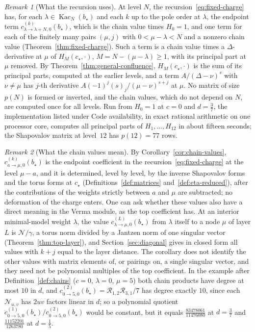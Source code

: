\documentclass[twoside,10pt]{article}
\numberwithin{equation}{section}
\theoremstyle{slbody}
\theoremstyle{definition}
\theoremstyle{remark}
\newtheorem*{remark*}{Remark}
\begin{document}
\begin{remark*}[What the recursion uses]
At level \(N\), the recursion~\eqref{eq:fixed-charge} has, for each
\(\lambda\in\operatorname{Kac}_N(b_\star)\) and each \(k\) up to the pole
order at \(\lambda\), the endpoint term
\(c^{(k)}_{\lambda\to\lambda+N,0}(b_\star)\), which is the chain value times
\(H_0=1\), and one term for each of the finitely many pairs \((\mu,j)\) with
\(0<\mu-\lambda<N\) and a nonzero chain value
(Theorem~\ref{thm:fixed-charge}).  Such a term is a chain value times a
\(\Delta\)-derivative at \(\mu\) of \(H_M(c_\star,\cdot)\), \(M=N-(\mu-\lambda)\geq1\),
with its principal part at \(\mu\) removed.  By
Theorem~\ref{thm:general-confluence}, \(H_M(c_\star,\cdot)\) is the sum of its
principal parts, computed at the earlier levels, and a term
\(A/(\Delta-\nu)^s\) with \(\nu\neq\mu\) has \(j\)-th derivative
\(A(-1)^j(s)_j/(\mu-\nu)^{s+j}\) at \(\mu\).  No matrix of size
\(p(N)\) is formed or inverted, and the chain values, which do not depend on
\(N\), are computed once for all levels.  Run from \(H_0=1\) at \(c=0\) and
\(d=\frac37\), the implementation listed under Code availability, in exact
rational arithmetic on one processor core, computes all principal parts of
\(H_1,\dots,H_{12}\) in about fifteen seconds; the Shapovalov matrix at
level~\(12\) has \(p(12)=77\) rows.
\end{remark*}

\begin{remark*}[What the chain values mean]
By Corollary~\ref{cor:chain-values}, $c^{(k)}_{a\to\mu,0}(b_\star)$ is the
endpoint coefficient in the recursion~\eqref{eq:fixed-charge} at the level
$\mu-a$, and it is determined, level by level, by the inverse Shapovalov forms
and the torus forms at $c_\star$ (Definitions~\ref{def:matrices}
and~\ref{def:eta-reduced}), after the contributions of the weights strictly
between $a$ and $\mu$ are subtracted; no deformation of the charge enters.
One can ask whether these values also have a direct meaning in the Verma
module, as the top coefficient has.  At an interior minimal-model weight
$\lambda$, the value $c^{(L)}_{\lambda\to\mu,0}(b_\star)$ from $\lambda$ itself
to a node $\mu$ of layer $L$ is $\mathcal N/\gamma$, a torus norm divided by a
Jantzen norm of one singular vector (Theorem~\ref{thm:top-layer}), and
Section~\ref{sec:diagonal} gives in closed form all values with $k+j$ equal to
the layer distance.  The corollary does not identify the other values with
matrix elements of, or pairings on, a single singular vector, and they need not
be polynomial multiples of the top coefficient.  In the example after
Definition~\ref{def:chains}
($c=0$, $\lambda=0$, $\mu=5$) both chain products have degree at most $10$ in
$d$, and $c^{(2)}_{0\to5,0}(b_\star)={\mathcal R}_{1,2}{\mathcal R}_{3,1}/7$ has
degree exactly $10$, since each $\mathcal N_{u,v}$ has $2uv$ factors linear in
$d$; so a polynomial quotient $c^{(1)}_{0\to5,0}(b_\star)/c^{(2)}_{0\to5,0}(b_\star)$
would be constant, but it equals $\frac{83478061}{11476080}$ at $d=\frac37$ and
$\frac{11152201}{1263780}$ at $d=\frac15$.
\end{remark*}
\end{document}
